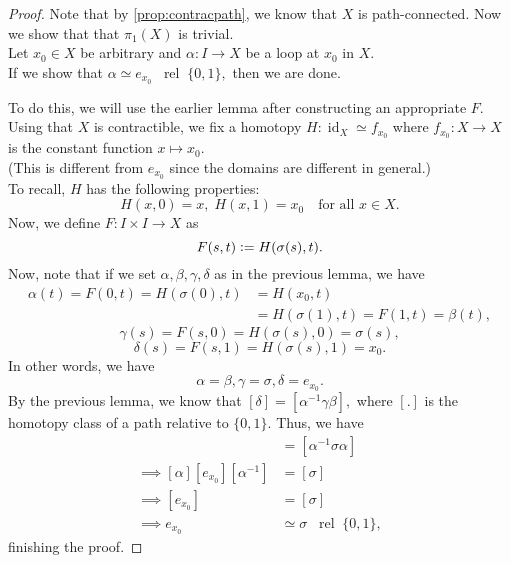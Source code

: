 \documentclass[12pt]{article}
\theoremstyle{definition}
\numberwithin{thm}{section}
\newcommand{\rel}{\;\;\operatorname{rel}\;}
\newcommand{\id}{\operatorname{id}}
\begin{document}
\begin{proof} 
	Note that by \cref{prop:contracpath}, we know that $X$ is path-connected. Now we show that that $\pi_1(X)$ is trivial.\\
	Let $x_0 \in X$ be arbitrary and $\alpha:I\to X$ be a loop at $x_0$ in $X.$\\
	If we show that $\alpha \simeq e_{x_0} \rel \{0, 1\},$ then we are done.

	To do this, we will use the earlier lemma after constructing an appropriate $F.$\\
	Using that $X$ is contractible, we fix a homotopy $H:\id_X \simeq f_{x_0}$ where $f_{x_0}:X\to X$ is the constant function $x \mapsto x_0.$\\
	(This is different from $e_{x_0}$ since the domains are different in general.)\\
	To recall, $H$ has the following properties:
	\begin{equation*} 
		H(x, 0) = x,\; H(x, 1) = x_0 \quad \text{for all } x \in X.
	\end{equation*}
	Now, we define $F:I\times I \to X$ as 
	\begin{equation*} 
		F(s, t) \vcentcolon= H(\sigma(s), t).
	\end{equation*}
	Now, note that if we set $\alpha, \beta, \gamma, \delta$ as in the previous lemma, we have
	\begin{align*} 
		\alpha(t) = F(0, t) = H(\sigma(0), t) &= H(x_0, t)\\
		&= H(\sigma(1), t) = F(1, t) = \beta(t),
	\end{align*}
	\begin{equation*} 
		\gamma(s) = F(s, 0) = H(\sigma(s), 0) = \sigma(s),
	\end{equation*}
	\begin{equation*} 
		\delta(s) = F(s, 1) = H(\sigma(s), 1) = x_0.
	\end{equation*}
	In other words, we have
	\begin{equation*} 
		\alpha = \beta, \gamma = \sigma, \delta = e_{x_0}.
	\end{equation*}
	By the previous lemma, we know that $[\delta] = [\alpha^{-1}\gamma\beta],$ where $[.]$ is the homotopy class of a path relative to $\{0, 1\}.$ Thus, we have
	\begin{align*} 
		[e_{x_0}] &= [\alpha^{-1}\sigma\alpha]\\
		\implies [\alpha][e_{x_0}][\alpha^{-1}] &= [\sigma]\\
		\implies [e_{x_0}] &= [\sigma]\\
		\implies e_{x_0} &\simeq \sigma \rel \{0, 1\},
	\end{align*}
	finishing the proof.
\end{proof}
\end{document}
